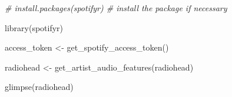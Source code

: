 \documentclass[
]{book}
\newenvironment{Shaded}{\begin{snugshade}}{\end{snugshade}}
\newcommand{\CommentTok}[1]{\textcolor[rgb]{0.56,0.35,0.01}{\textit{#1}}}
\newcommand{\FunctionTok}[1]{\textcolor[rgb]{0.00,0.00,0.00}{#1}}
\newcommand{\NormalTok}[1]{#1}
\newcommand{\OtherTok}[1]{\textcolor[rgb]{0.56,0.35,0.01}{#1}}
\newcommand{\StringTok}[1]{\textcolor[rgb]{0.31,0.60,0.02}{#1}}
\begin{document}
\begin{Shaded}
\begin{Highlighting}[]
\CommentTok{\# install.packages(\textquotesingle{}spotifyr\textquotesingle{}) \# install the package if necessary}

\FunctionTok{library}\NormalTok{(spotifyr)}


\NormalTok{access\_token }\OtherTok{\textless{}{-}} \FunctionTok{get\_spotify\_access\_token}\NormalTok{()}


\NormalTok{radiohead }\OtherTok{\textless{}{-}} \FunctionTok{get\_artist\_audio\_features}\NormalTok{(}\StringTok{\textquotesingle{}radiohead\textquotesingle{}}\NormalTok{)}

\FunctionTok{glimpse}\NormalTok{(radiohead)}
\end{Highlighting}
\end{Shaded}
\end{document}
